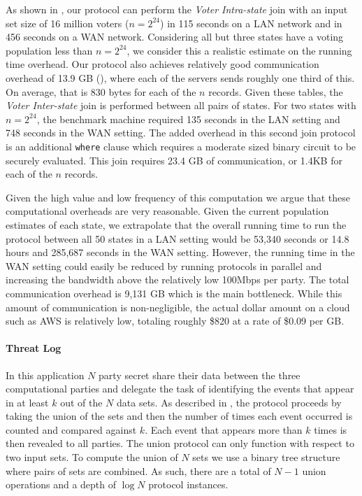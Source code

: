As shown in , our  protocol can perform the \emph{Voter Intra-state} join with an input set size of 16 million voters ($n=2^{24}$) in 115 seconds on a LAN network and in 456 seconds on a WAN network. Considering all but three states have a voting population less than $n=2^{24}$, we consider this a realistic estimate on the running time overhead. Our protocol also achieves relatively good communication overhead of 13.9 GB (), where each of the servers sends roughly one third of this. On average, that is 830 bytes for each of the $n$ records. Given these tables, the \emph{Voter Inter-state} join is performed between all pairs of states. For two states with $n=2^{24}$, the benchmark machine required 135 seconds in the LAN setting and 748 seconds in the WAN setting. The added overhead in this second join protocol is an additional \texttt{where} clause which requires a moderate sized binary circuit to be securely evaluated. This join requires 23.4 GB of communication, or 1.4KB for each of the $n$ records.

Given the high value and low frequency of this computation we argue that these computational overheads are very reasonable. Given the current population estimates of each state, we extrapolate that the overall running time to run the protocol between all 50 states in a LAN setting would be 53,340 seconds or 14.8 hours and  285,687 seconds in the WAN setting. However, the running time in the WAN setting could easily be reduced by running protocols in parallel and increasing the bandwidth above the relatively low 100Mbps per party. The total communication overhead is 9,131 GB which is the main bottleneck.  While this amount of communication is non-negligible, the actual dollar amount on a cloud such as AWS\cite{aws} is relatively low, totaling roughly \$820 at a rate of \$0.09 per GB\cite{aws_pricing}. 


\paragraph{Threat Log} In this application $N$ party secret share their data between the three computational parties and delegate the task of identifying the events that appear in at least $k$ out of the $N$ data sets. As described in , the protocol proceeds by taking the union of the sets and then the number of times each event occurred is counted and compared against $k$. Each event that appears more than $k$ times is then revealed to all parties. The union protocol can only function with respect to two input sets. To compute the union of $N$ sets we use a binary tree structure where pairs of sets are combined. As such, there are a total of $N-1$ union operations and a depth of $\log N$ protocol instances.

